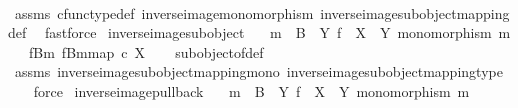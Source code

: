 \begin{isabellebody}
%
\isadelimproof
\ \ %
\endisadelimproof
%
\isatagproof
{}\isamarkupfalse%
\ assms\ cfunc{\isacharunderscore}{\kern0pt}type{\isacharunderscore}{\kern0pt}def\ inverse{\isacharunderscore}{\kern0pt}image{\isacharunderscore}{\kern0pt}monomorphism\ inverse{\isacharunderscore}{\kern0pt}image{\isacharunderscore}{\kern0pt}subobject{\isacharunderscore}{\kern0pt}mapping{\isacharunderscore}{\kern0pt}def\ \isamarkupfalse%
\ fastforce%
\endisatagproof
{\isafoldproof}%
%
\isadelimproof
\isanewline
%
\endisadelimproof
\isanewline
{}\isamarkupfalse%
\ inverse{\isacharunderscore}{\kern0pt}image{\isacharunderscore}{\kern0pt}subobject{\isacharcolon}{\kern0pt}\isanewline
\ \ \ {\isachardoublequoteopen}m\ {\isacharcolon}{\kern0pt}\ B\ {\isasymrightarrow}\ Y{\isachardoublequoteclose}\ {\isachardoublequoteopen}f\ {\isacharcolon}{\kern0pt}\ X\ {\isasymrightarrow}\ Y{\isachardoublequoteclose}\ {\isachardoublequoteopen}monomorphism\ m{\isachardoublequoteclose}\isanewline
\ \ \ {\isachardoublequoteopen}{\isacharparenleft}{\kern0pt}f\isactrlsup {\isacharminus}{\kern0pt}B{\isasymrparr}\isactrlbsub m\isactrlesub {\isacharcomma}{\kern0pt}\ {\isacharbrackleft}{\kern0pt}f\isactrlsup {\isacharminus}{\kern0pt}B{\isasymrparr}\isactrlbsub m\isactrlesub {\isacharbrackright}{\kern0pt}map{\isacharparenright}{\kern0pt}\ {\isasymsubseteq}\isactrlsub c\ X{\isachardoublequoteclose}\isanewline
%
\isadelimproof
\ \ %
\endisadelimproof
%
\isatagproof
{}\isamarkupfalse%
\ subobject{\isacharunderscore}{\kern0pt}of{\isacharunderscore}{\kern0pt}def{}\isanewline
\ \ \isamarkupfalse%
\ assms\ inverse{\isacharunderscore}{\kern0pt}image{\isacharunderscore}{\kern0pt}subobject{\isacharunderscore}{\kern0pt}mapping{\isacharunderscore}{\kern0pt}mono\ inverse{\isacharunderscore}{\kern0pt}image{\isacharunderscore}{\kern0pt}subobject{\isacharunderscore}{\kern0pt}mapping{\isacharunderscore}{\kern0pt}type\isanewline
\ \ \isamarkupfalse%
\ force%
\endisatagproof
{\isafoldproof}%
%
\isadelimproof
\isanewline
%
\endisadelimproof
\isanewline
{}\isamarkupfalse%
\ inverse{\isacharunderscore}{\kern0pt}image{\isacharunderscore}{\kern0pt}pullback{\isacharcolon}{\kern0pt}\isanewline
\ \ \ {\isachardoublequoteopen}m\ {\isacharcolon}{\kern0pt}\ B\ {\isasymrightarrow}\ Y{\isachardoublequoteclose}\ {\isachardoublequoteopen}f\ {\isacharcolon}{\kern0pt}\ X\ {\isasymrightarrow}\ Y{\isachardoublequoteclose}\ {\isachardoublequoteopen}monomorphism\ m{\isachardoublequoteclose}\isanewline

\end{isabellebody}
